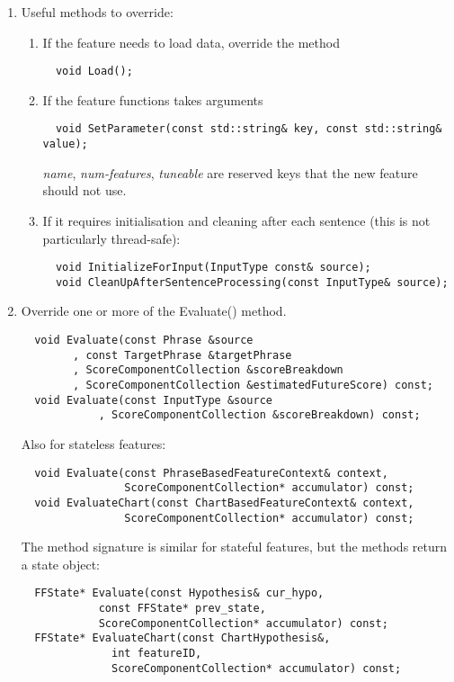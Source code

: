 \documentclass{pbml}
\begin{document}
\begin{enumerate}
    \item Useful methods to override:
      \begin{enumerate}
        \item If the feature needs to load data, override the method
	  \begin{verbatim}
  void Load();
	  \end{verbatim}
        \item If the feature functions takes arguments
	  \begin{verbatim}
  void SetParameter(const std::string& key, const std::string& value);
	  \end{verbatim}
\emph{name}, \emph{num-features}, \emph{tuneable} are reserved keys that the new feature should not use.
	\item If it requires initialisation and cleaning after each sentence (this is not particularly thread-safe):
	  \begin{verbatim}
  void InitializeForInput(InputType const& source);
  void CleanUpAfterSentenceProcessing(const InputType& source);
	  \end{verbatim}
       \end{enumerate}
    \item Override one or more of the Evaluate() method. 
      \begin{verbatim}
  void Evaluate(const Phrase &source
	    , const TargetPhrase &targetPhrase
	    , ScoreComponentCollection &scoreBreakdown
	    , ScoreComponentCollection &estimatedFutureScore) const;
  void Evaluate(const InputType &source
            , ScoreComponentCollection &scoreBreakdown) const;
       \end{verbatim}
Also for stateless features:
      \begin{verbatim}
  void Evaluate(const PhraseBasedFeatureContext& context,
                ScoreComponentCollection* accumulator) const;
  void EvaluateChart(const ChartBasedFeatureContext& context,
                ScoreComponentCollection* accumulator) const;
       \end{verbatim}
The method signature is similar for stateful features, but the methods return a state object:
      \begin{verbatim}
  FFState* Evaluate(const Hypothesis& cur_hypo,
		    const FFState* prev_state,
		    ScoreComponentCollection* accumulator) const;
  FFState* EvaluateChart(const ChartHypothesis&,
		      int featureID,
		      ScoreComponentCollection* accumulator) const;
      \end{verbatim}

\end{enumerate}
\end{document}
